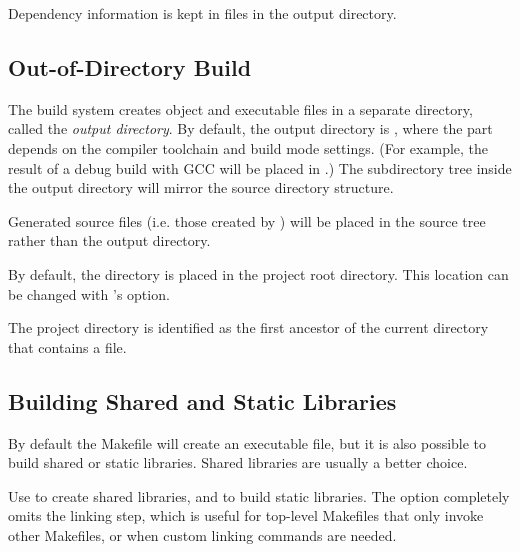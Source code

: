 Dependency information is kept in  files in the output directory.


\subsection{Out-of-Directory Build}
\label{sec:build-sim-progs:out-of-directory-build}

The build system creates object and executable files in a separate directory, called the
\textit{output directory}. By default, the output directory is ,
where the  part depends on the compiler toolchain and build mode settings.
(For example, the result of a debug build with GCC will be placed in .)
The subdirectory tree inside the output directory will mirror the source directory
structure.

\begin{note}
Generated source files (i.e. those created by ) will be placed in the
source tree rather than the output directory.
\end{note}

By default, the  directory is placed in the project root directory. This location
can be changed with 's  option.


\begin{note}
The project directory is identified as the first ancestor of the current directory
that contains a  file.
\end{note}


\subsection{Building Shared and Static Libraries}
\label{sec:build-sim-progs:building-shared-and-static-libraries}

By default the Makefile will create an executable file, but it is also
possible to build shared or static libraries. Shared libraries
are usually a better choice.

Use  to create shared libraries, and 
to build static libraries. The  option completely omits
the linking step, which is useful for top-level Makefiles that only invoke
other Makefiles, or when custom linking commands are needed.

